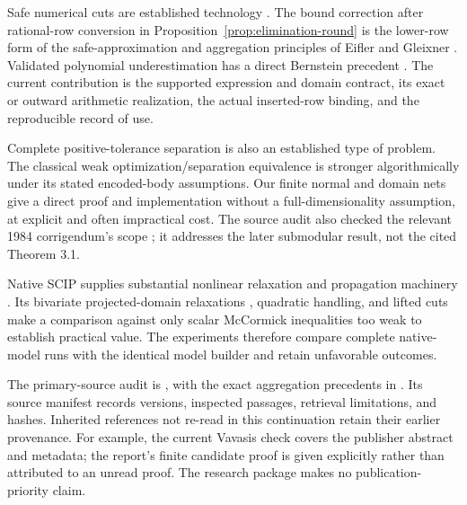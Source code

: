 Safe numerical cuts are established technology
\cite{CookEtAl2009SafeCuts}. The bound correction after rational-row
conversion in Proposition~\ref{prop:elimination-round} is the lower-row
form of the safe-approximation and aggregation principles of Eifler
and Gleixner \cite[Sections 2.2--2.3]{EiflerGleixner2024}.
Validated polynomial underestimation has a direct Bernstein precedent
\cite{GarloffSmith2008,GarloffJanssonSmith2003}. The current contribution
is the supported expression and domain contract, its exact or outward
arithmetic realization, the actual inserted-row binding, and the
reproducible record of use.

Complete positive-tolerance separation is also an established type of
problem. The classical weak optimization/separation equivalence
\cite{GrotschelLovaszSchrijver1981} is stronger algorithmically under
its stated encoded-body assumptions. Our finite normal and domain nets
give a direct proof and implementation without a full-dimensionality
assumption, at explicit and often impractical cost. The source audit
also checked the relevant 1984 corrigendum's scope
\cite{GrotschelLovaszSchrijver1984}; it addresses the later submodular
result, not the cited Theorem 3.1.

Native SCIP supplies substantial nonlinear relaxation and propagation
machinery \cite{BestuzhevaEtAl2025}. Its bivariate projected-domain
relaxations \cite{MullerSerranoGleixner2020}, quadratic handling, and
lifted cuts make a comparison against only scalar McCormick inequalities
too weak to establish practical value. The experiments therefore compare
complete native-model runs with the identical model builder and retain
unfavorable outcomes.

The primary-source audit is
, with the exact
aggregation precedents in
.
Its source manifest records versions, inspected passages, retrieval
limitations, and hashes. Inherited references not re-read in this
continuation retain their earlier provenance. For example, the current
Vavasis check covers the publisher abstract and metadata; the report's
finite candidate proof is given explicitly rather than attributed to an
unread proof. The research package makes no publication-priority claim.
